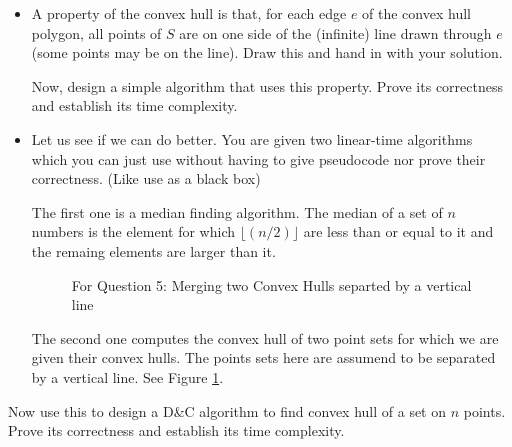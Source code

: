 \documentclass[11pt]{article}
\begin{document}
\begin{itemize}
	
	\item A property of the convex hull  is that, for each edge $e$ of  the convex hull polygon, all points of $S$ are on one side of the (infinite) line drawn through $e$ (some points may be on the line). Draw  this  and hand in with your solution.
	
	 \noindent  Now, design a simple algorithm that uses this property. Prove its correctness and establish its time complexity. 
	  \item Let us see if we can do better. You are given two linear-time algorithms which you can just use without having to give pseudocode nor prove their correctness.  (Like use as a black box)
	  
	  	\noindent\noindent The first one is  a median finding algorithm. The median of a set of $n$ numbers  is the element for which $\lfloor(n/2) \rfloor $ are less than or equal to it and the remaing elements are larger than it.
	  	
	  		\begin{figure}
	  		\centerline{}
	  		\caption{For Question 5: Merging two Convex Hulls separted by a vertical line}
	  		\label{fig:convexpolygon-merging}
	  	\end{figure}
	  	
	  		\noindent\noindent  The second one computes the convex hull of two point sets for which we are given their convex hulls. The points sets here are assumend to be separated by a vertical line.  See Figure \ref{fig:convexpolygon-merging}.
	  	
	
\end{itemize}
 
Now use this to design a D\&C algorithm to find   convex hull of a set on $n$ points. Prove its correctness and establish its time complexity.  



%

\end{document}
